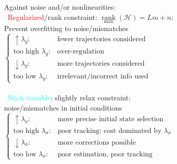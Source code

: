 \begin{minipage}{0.43\textwidth}
    Against noise and/or nonlinearities: \\
    \textbullet \, \textcolor{red}{Regularized}/rank constraint: $\underset{\text{max}}{\operatorname{rank}}(\mathcal{H}) = Lm + n$: \\
    Prevent overfitting to noise/mismatches \\
    $\begin{cases} 
    \uparrow \lambda_g: &\text{fewer trajectories considered}\\ 
    \text{too high } \lambda_g: &\text{over-regulation}\\ 
    \downarrow \lambda_g: &\text{more trajectories considered} \\
    \text{too low } \lambda_g: &\text{irrelevant/incorrect info used}
    \end{cases}$ \\ \\
    \textbullet \, \textcolor{cyan}{Slack variable}: slightly relax constraint: \\ noise/mismatches in initial conditions \\
    $\begin{cases} 
    \uparrow \lambda_\sigma: &\text{more precise initial state selection}\\ 
    \text{too high } \lambda_\sigma: &\text{poor tracking: cost dominated by $\lambda_\sigma$}\\ 
    \downarrow \lambda_\sigma: &\text{more corrections possible} \\
    \text{too low } \lambda_\sigma: &\text{poor estimation, poor tracking}
    \end{cases}$ 
\end{minipage}